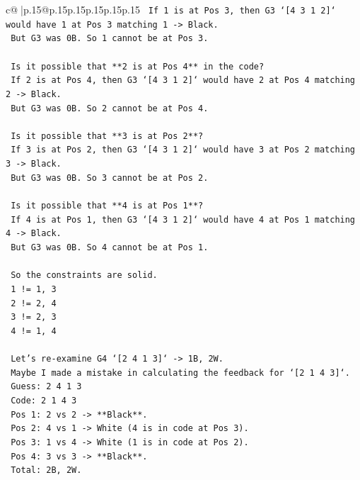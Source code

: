 \documentclass{article}
\begin{document}
{\begin{supertabular}{c@{$\;$}|p{.15\linewidth}@{}p{.15\linewidth}p{.15\linewidth}p{.15\linewidth}p{.15\linewidth}p{.15\linewidth}}
{{{\texttt{    If 1 is at Pos 3, then G3 `{[}4 3 1 2{]}` would have 1 at Pos 3 matching 1 {-}> Black.} \\
\texttt{    But G3 was 0B. So 1 cannot be at Pos 3.} \\
\\ 
\texttt{    Is it possible that **2 is at Pos 4** in the code?} \\
\texttt{    If 2 is at Pos 4, then G3 `{[}4 3 1 2{]}` would have 2 at Pos 4 matching 2 {-}> Black.} \\
\texttt{    But G3 was 0B. So 2 cannot be at Pos 4.} \\
\\ 
\texttt{    Is it possible that **3 is at Pos 2**?} \\
\texttt{    If 3 is at Pos 2, then G3 `{[}4 3 1 2{]}` would have 3 at Pos 2 matching 3 {-}> Black.} \\
\texttt{    But G3 was 0B. So 3 cannot be at Pos 2.} \\
\\ 
\texttt{    Is it possible that **4 is at Pos 1**?} \\
\texttt{    If 4 is at Pos 1, then G3 `{[}4 3 1 2{]}` would have 4 at Pos 1 matching 4 {-}> Black.} \\
\texttt{    But G3 was 0B. So 4 cannot be at Pos 1.} \\
\\ 
\texttt{    So the constraints are solid.} \\
\texttt{    1 != 1, 3} \\
\texttt{    2 != 2, 4} \\
\texttt{    3 != 2, 3} \\
\texttt{    4 != 1, 4} \\
\\ 
\texttt{    Let's re{-}examine G4 `{[}2 4 1 3{]}` {-}> 1B, 2W.} \\
\texttt{    Maybe I made a mistake in calculating the feedback for `{[}2 1 4 3{]}`.} \\
\texttt{    Guess: 2 4 1 3} \\
\texttt{    Code: 2 1 4 3} \\
\texttt{    Pos 1: 2 vs 2 {-}> **Black**.} \\
\texttt{    Pos 2: 4 vs 1 {-}> White (4 is in code at Pos 3).} \\
\texttt{    Pos 3: 1 vs 4 {-}> White (1 is in code at Pos 2).} \\
\texttt{    Pos 4: 3 vs 3 {-}> **Black**.} \\
\texttt{    Total: 2B, 2W.} \\
}}}
\end{supertabular}}
\end{document}
